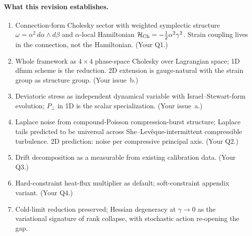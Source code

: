 \documentclass[11pt]{article}
\newcommand{\half}{\tfrac{1}{2}}
\begin{document}
\paragraph{What this revision establishes.}
\begin{enumerate}
\item Connection-form Cholesky sector with weighted symplectic structure
$\omega = \alpha^2\,d\alpha\wedge d\beta$ and $\alpha$-local Hamiltonian
$\mathcal{H}_{\rm Ch} = -\half\alpha^2\gamma^2$. Strain coupling lives
in the connection, not the Hamiltonian. (Your Q1.)
\item Whole framework as $4{\times}4$ phase-space Cholesky over
Lagrangian space; 1D dfmm scheme is the reduction. 2D extension is
gauge-natural with the strain group as structure group. (Your issue~b.)
\item Deviatoric stress as independent dynamical variable with
Israel--Stewart-form evolution; $P_\perp$ in 1D is the scalar
specialization. (Your issue~a.)
\item Laplace noise from compound-Poisson compression-burst structure;
Laplace tails predicted to be universal across She--Lev\^eque-intermittent
compressible turbulence. 2D prediction: noise per compressive principal
axis. (Your Q2.)
\item Drift decomposition as a measurable from existing calibration data.
(Your Q3.)
\item Hard-constraint heat-flux multiplier as default; soft-constraint
appendix variant. (Your Q4.)
\item Cold-limit reduction preserved; Hessian degeneracy at
$\gamma\to 0$ as the variational signature of rank collapse, with
stochastic action re-opening the gap.
\end{enumerate}
\end{document}
